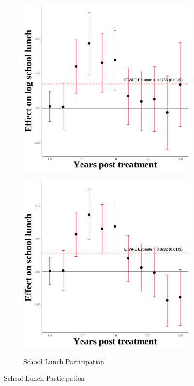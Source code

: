 \documentclass[12pt,english]{article}
\begin{document}
\begin{figure}[H]
\begin{subfigure}[b]{0.3\textwidth}
    \includegraphics[width=\linewidth]{figures/plot58-ln_schl_lunch_event_study-third-one.png}
    \label{fig:ln-schl-lunch-third-one}
  \end{subfigure}
  \hfill
  \begin{subfigure}[b]{0.3\textwidth}
    \centering
    \caption{School Lunch Participation}
    \includegraphics[width=\linewidth]{figures/plot59-schl_lunch_event_study-third-one.png}
    \label{fig:schl-lunch-third-one}
  \end{subfigure}


\end{figure}
\end{document}
